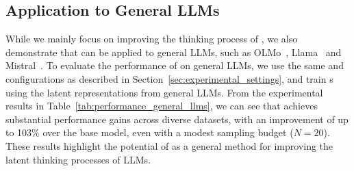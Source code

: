 \documentclass{article} %
\begin{document}
\subsection{Application to General LLMs}\label{sec:application_to_general_LLMs}

While we mainly focus on improving the thinking process of \LRLM, we also demonstrate that \LTO can be applied to general LLMs, such as OLMo~\citep{groeneveld2024olmo}, Llama~\citep{touvron2023llama2} and Mistral~\citep{jiang2023mistral}. 
%
%
To evaluate the performance of \LTO on general LLMs, we use the same \LRM and \LTO configurations as described in Section~\ref{sec:experimental_settings}, and train {\LRM}s using the latent representations from general LLMs. 
%
From the experimental results in Table~\ref{tab:performance_general_llms}, we can see that \LTO achieves substantial performance gains across diverse datasets, with an improvement of up to 103\% over the base model, even with a modest sampling budget ($N=20$). 
%
These results highlight the potential of \LTO as a general method for improving the latent thinking processes of LLMs.
\end{document}
